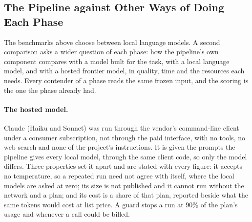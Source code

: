 
\subsection{The Pipeline against Other Ways of Doing Each Phase}
\label{subsec:benchmark-frameworks}

The benchmarks above choose between local language models. A second
comparison asks a wider question of each phase: how the pipeline's own
component compares with a model built for the task, with a local
language model, and with a hosted frontier model, in quality, time and
the resources each needs. Every contender of a phase reads the same
frozen input, and the scoring is the one the phase already had.

\paragraph{The hosted model.} Claude (Haiku and Sonnet) was run through
the vendor's command-line client under a consumer subscription, not
through the paid interface, with no tools, no web search and none of the
project's instructions. It is given the prompts the pipeline gives every
local model, through the same client code, so only the model differs.
Three properties set it apart and are stated with every figure: it
accepts no temperature, so a repeated run need not agree with itself,
where the local models are asked at zero; its size is not published and
it cannot run without the network and a plan; and its cost is a share of
that plan, reported beside what the same tokens would cost at list
price. A guard stops a run at 90\% of the plan's usage and whenever a
call could be billed.

